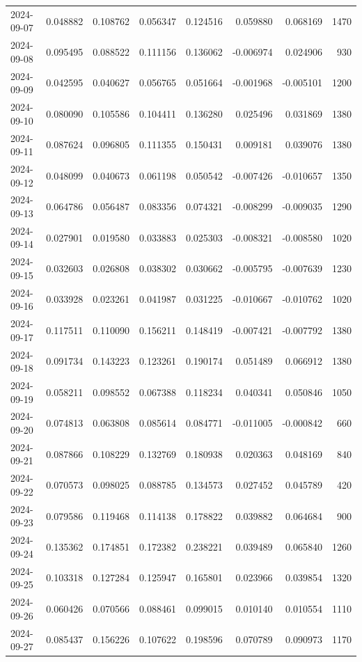 \begin{tabular}{lrrrrrrr}
2024-09-07 & 0.048882 & 0.108762 & 0.056347 & 0.124516 & 0.059880 & 0.068169 & 1470 \\
2024-09-08 & 0.095495 & 0.088522 & 0.111156 & 0.136062 & -0.006974 & 0.024906 & 930 \\
2024-09-09 & 0.042595 & 0.040627 & 0.056765 & 0.051664 & -0.001968 & -0.005101 & 1200 \\
2024-09-10 & 0.080090 & 0.105586 & 0.104411 & 0.136280 & 0.025496 & 0.031869 & 1380 \\
2024-09-11 & 0.087624 & 0.096805 & 0.111355 & 0.150431 & 0.009181 & 0.039076 & 1380 \\
2024-09-12 & 0.048099 & 0.040673 & 0.061198 & 0.050542 & -0.007426 & -0.010657 & 1350 \\
2024-09-13 & 0.064786 & 0.056487 & 0.083356 & 0.074321 & -0.008299 & -0.009035 & 1290 \\
2024-09-14 & 0.027901 & 0.019580 & 0.033883 & 0.025303 & -0.008321 & -0.008580 & 1020 \\
2024-09-15 & 0.032603 & 0.026808 & 0.038302 & 0.030662 & -0.005795 & -0.007639 & 1230 \\
2024-09-16 & 0.033928 & 0.023261 & 0.041987 & 0.031225 & -0.010667 & -0.010762 & 1020 \\
2024-09-17 & 0.117511 & 0.110090 & 0.156211 & 0.148419 & -0.007421 & -0.007792 & 1380 \\
2024-09-18 & 0.091734 & 0.143223 & 0.123261 & 0.190174 & 0.051489 & 0.066912 & 1380 \\
2024-09-19 & 0.058211 & 0.098552 & 0.067388 & 0.118234 & 0.040341 & 0.050846 & 1050 \\
2024-09-20 & 0.074813 & 0.063808 & 0.085614 & 0.084771 & -0.011005 & -0.000842 & 660 \\
2024-09-21 & 0.087866 & 0.108229 & 0.132769 & 0.180938 & 0.020363 & 0.048169 & 840 \\
2024-09-22 & 0.070573 & 0.098025 & 0.088785 & 0.134573 & 0.027452 & 0.045789 & 420 \\
2024-09-23 & 0.079586 & 0.119468 & 0.114138 & 0.178822 & 0.039882 & 0.064684 & 900 \\
2024-09-24 & 0.135362 & 0.174851 & 0.172382 & 0.238221 & 0.039489 & 0.065840 & 1260 \\
2024-09-25 & 0.103318 & 0.127284 & 0.125947 & 0.165801 & 0.023966 & 0.039854 & 1320 \\
2024-09-26 & 0.060426 & 0.070566 & 0.088461 & 0.099015 & 0.010140 & 0.010554 & 1110 \\
2024-09-27 & 0.085437 & 0.156226 & 0.107622 & 0.198596 & 0.070789 & 0.090973 & 1170 \\

\end{tabular}
